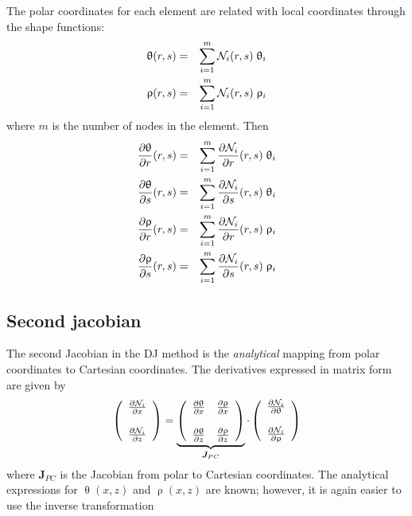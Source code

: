 The polar coordinates for each element are related with local coordinates through the shape functions:
\begin{eqnarray}
\uptheta(r,s) &=& \sum_{i=1}^m {\mathcal{N}}_i(r,s) \; \uptheta_i\\
\uprho(r,s) &=&  \sum_{i=1}^m {\mathcal{N}}_i(r,s) \; \uprho_i
\end{eqnarray}
where $m$ is the number of nodes in the element.
Then
\begin{eqnarray}
\frac{\partial\uptheta}{\partial r}(r,s) &=& \sum_{i=1}^m \frac{\partial{\mathcal{N}}_i}{\partial r}(r,s)\; \uptheta_i\\
\frac{\partial\uptheta}{\partial s}(r,s) &=& \sum_{i=1}^m \frac{\partial{\mathcal{N}}_i}{\partial s}(r,s)\; \uptheta_i\\
\frac{\partial\uprho}{\partial r}(r,s)   &=& \sum_{i=1}^m \frac{\partial{\mathcal{N}}_i}{\partial r}(r,s)\; \uprho_i \\
\frac{\partial\uprho}{\partial s}(r,s)   &=& \sum_{i=1}^m \frac{\partial{\mathcal{N}}_i}{\partial s}(r,s)\; \uprho_i
\end{eqnarray}



\subsection{Second jacobian}

The second Jacobian in the DJ method is the {\it analytical} 
mapping from polar coordinates to Cartesian coordinates. The derivatives 
expressed in matrix form are given by
\begin{equation}
\left(
\begin{array}{c}
\frac{\partial {\mathcal{N}}_i}{\partial x} \\ \\
\frac{\partial {\mathcal{N}}_i}{\partial z} 
\end{array}
\right)
= 
\underbrace{\left(
\begin{array}{cc}
\frac{\partial \uptheta}{\partial x}  & 
\frac{\partial \uprho}{\partial x}   \\ \\
\frac{\partial \uptheta}{\partial z}  & 
\frac{\partial \uprho}{\partial z}  
\end{array}
\right)}_{{\bm J}_{PC}}
\cdot
\left(
\begin{array}{c}
\frac{\partial {\mathcal{N}}_i}{\partial \uptheta} \\ \\
\frac{\partial {\mathcal{N}}_i}{\partial \uprho} 
\end{array}
\right)
\label{eq:DJ3}
\end{equation}
where ${\bm J}_{PC}$ is the Jacobian from polar to Cartesian coordinates. 
The analytical expressions for $\uptheta(x,z)$ and $\uprho(x,z)$ are known; 
however, it is again easier to use the inverse transformation


